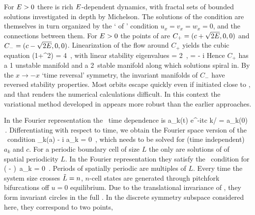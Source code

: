 For $E>0$ there is rich
$E$-dependent dynamics, with
fractal sets of bounded solutions investigated in
depth by Michelson.
The solutions of the {\eqv}  condition
 are themselves in turn organized by the
`{\eqva}  of {\eqva}'  condition
\( u_x= v_x= w_x= 0 \), and
the connections between them.
    For $E>0$ the {\reqva}  points of  are
$C_{+}=(c+\sqrt{2E},0,0)$ and $C_{-}=(c-\sqrt{2E},0,0)$.
Linearization of the flow around $C_{+}$ yields the cubic equation
  \beq
\eigExp(1+\eigExp^2) = 4 \expctE
\,,
with linear stability eigenvalues
\beq
\eigExp[1] = 2 \eigRe
    \,,\qquad
\eigExp[2,3] = - \eigRe \pm i \eigIm
{}
Hence $C_{+}$ has a {1\dmn}
unstable manifold and a 2\dmn\ stable manifold
along which solutions spiral in.
By the $x \to -x$ `time reversal' symmetry, the
invariant manifolds of $C_{-}$
have reversed stability properties.
Most orbits escape quickly even if initiated close to \eqva, and that
renders the numerical calculations
difficult.
In this context the variational method
developed in 
appears more robust than
the earlier approaches.


%

In the Fourier representation the \reqva\ time
dependence is
\beq
 a_k(t) e^{-itc k/\tildeL} = a_k(0)
\,.
Differentiating with respect to time, we obtain
the Fourier space version of the \reqv\ condition
\beq
 \pVeloc_k(a) - i  a_k = 0
\,,
which needs to be solved for (time independent) $a_k$ and $c$.
For a periodic boundary cell of size
$L$ the only {\eqva}  are
solutions of  of spatial periodicity $L$.
In the Fourier representation they satisfy
the \eqv\ condition for 
\beq
\left(  -   \right)\, a_k
  = 0
\,.
\label{eq:stfks}
\eeq
Periods of spatially periodic {\eqva} are multiples of $L$.
Every time the system size crosses  $\tilde{L}=n$,
$n$-cell states
are generated through pitchfork bifurcations off $u =0$
equilibrium.
Due to the translational invariance of {\KSe},
they form invariant circles
in the full \statesp.
In the discrete symmetry subspace considered here, they correspond to two points,

